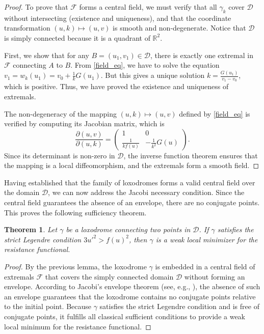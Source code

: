 \documentclass[a4paper,12pt]{amsart}
\newtheorem{theorem}{Theorem}[section]
\theoremstyle{definition}
\def\r{\mathbb R}
\begin{document}
\begin{proof}
To prove that $\mathcal{F}$ forms a central field, we must verify that all $\gamma_k$ cover $\mathcal{D}$ without intersecting (existence and uniqueness), and that the coordinate transformation $(u, k) \mapsto (u, v)$ is smooth and non-degenerate. Notice that $\mathcal{D}$ is simply connected because it is a quadrant of $\r^2$. 

First, we show that for any   $B=(u_1, v_1) \in \mathcal{D}$, there is exactly one extremal in $\mathcal{F}$ connecting $A$ to $B$. From \eqref{field_eq}, we have to solve   the equation $v_1 =w_k(u_1)= v_0 + \frac{1}{k} G(u_1)$. But this gives a unique solution $k = \frac{G(u_1)}{v_1 - v_0}$, which is positive. Thus, we have proved the existence and uniqueness of extremals. 

The non-degeneracy of  the mapping $(u, k) \mapsto (u, v)$ defined by \eqref{field_eq} is verified by computing its Jacobian matrix, which is  
\begin{equation*}
\frac{\partial (u, v)}{\partial (u, k)} = 
\begin{pmatrix} 
1 & 0 \\ 
\frac{1}{k f(u)} & -\frac{1}{k^2} G(u) 
\end{pmatrix}.
\end{equation*}
Since its determinant is non-zero in $\mathcal{D}$, the inverse function theorem ensures that the mapping is a local diffeomorphism, and the extremals form a smooth field. 
\end{proof}
 
 Having established that the family of loxodromes forms a valid central field 
 over the domain $\mathcal{D}$, we can now address the Jacobi necessary condition. 
 Since the central field guarantees the absence of an envelope, there are no conjugate points. This proves the following   sufficiency theorem.
 
 \begin{theorem} \label{t43}
Let $\gamma$ be a loxodrome connecting two points in $\mathcal{D}$. If $\gamma$ satisfies the strict Legendre condition $3u'^2>f(u)^2$, then   $\gamma$ is a weak local minimizer for the resistance functional.
\end{theorem}

\begin{proof}
By the previous lemma, the loxodrome $\gamma$ is embedded in a central field of extremals $\mathcal{F}$ that   covers the simply connected domain $\mathcal{D}$ without forming an envelope. According to Jacobi's envelope theorem (see, e.g., \cite{gf}), the absence of such an envelope guarantees that the loxodrome contains no conjugate points relative to the initial point. Because $\gamma$ satisfies the strict Legendre condition and is free of conjugate points, it fulfills all classical sufficient conditions to provide a weak local minimum for the resistance functional.
\end{proof}
 
\end{document}
